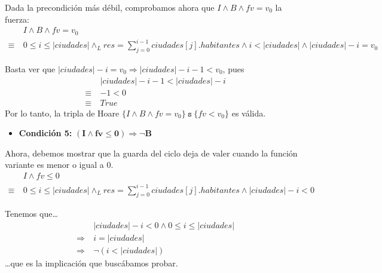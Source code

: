 \documentclass[10pt,a4paper]{article}
\begin{document}
Dada la precondición más débil, comprobamos ahora que $I \land B \land fv = v_0$ la fuerza:
\begin{equation*}
    \begin{split}
    & I \land B \land fv = v_0 \\
    \equiv \ & 0 \leq i \leq |ciudades| \land_L res = \sum_{j = 0}^{i - 1} ciudades[j].habitantes \land i < |ciudades| \land |ciudades| - i = v_0
    \end{split}
\end{equation*}

Basta ver que $|ciudades| - i = v_0 \Rightarrow |ciudades| - i - 1 < v_0$, pues 
\begin{equation*}
    \begin{split}
    & |ciudades| - i - 1 < |ciudades| - i \\
    \equiv \ & -1 < 0 \\
    \equiv \ & True
    \end{split}
\end{equation*}
Por lo tanto, la tripla de Hoare $\{I \land B \land fv = v_0\} \ \mathtt{s} \ \{fv < v_0\}$ es válida. \\


\begin{itemize}
    \item{\textbf{Condición 5:} $\mathbf{(I \land fv \leq 0) \Rightarrow \lnot B}$}
\end{itemize}

Ahora, debemos mostrar que la guarda del ciclo deja de valer cuando la función variante es menor o igual a 0. \\
\begin{equation*}
    \begin{split}
    & I \land fv \leq 0 \\
    \equiv \ & 0 \leq i \leq |ciudades| \land_L res = \sum_{j = 0}^{i - 1} ciudades[j].habitantes \land |ciudades| - i < 0
    \end{split}
\end{equation*}

Tenemos que\ldots \\
\begin{equation*}
    \begin{split}
        & |ciudades| - i < 0 \land 0 \leq i \leq |ciudades| \\
        \Rightarrow \ & i = |ciudades| \\
        \Rightarrow \ & \lnot(i < |ciudades|)
    \end{split}
\end{equation*}
\ldots que es la implicación que buscábamos probar.
\end{document}
